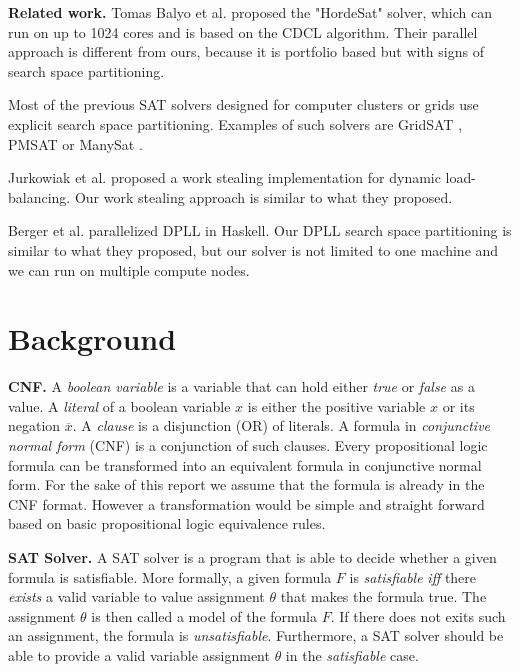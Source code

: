 \documentclass[letterpaper]{article}
\newcommand{\mypar}[1]{{\bf #1.}}
\begin{document}
\mypar{Related work}
Tomas Balyo et al. proposed the "HordeSat" solver, which can run on up to 1024 cores and is based on the CDCL algorithm.
Their parallel approach is different from ours, because it is portfolio based but with signs of search space partitioning. \cite{hordesat}

Most of the previous SAT solvers designed for computer clusters or grids use explicit search space partitioning.
Examples of such solvers are GridSAT \cite{gridsat}, PMSAT \cite{pmsat} or ManySat \cite{manysat}.

Jurkowiak et al. proposed a work stealing implementation for dynamic load-balancing. \cite{stealing}
Our work stealing approach is similar to what they proposed.

Berger et al. parallelized DPLL in Haskell. \cite{dpll_haskell}
Our DPLL search space partitioning is similar to what they proposed, but our solver is not limited to one machine and we can run on multiple compute nodes.

\section{Background}\label{sec:background}

\mypar{CNF}
A \textit{boolean variable} is a variable that can hold either \textit{true} or \textit{false} as a value.
A \textit{literal} of a boolean variable $x$ is either the positive variable $x$ or its negation $\overline{x}$.
A \textit{clause} is a disjunction (OR) of literals.
A formula in \textit{conjunctive normal form} (CNF) is a conjunction of such clauses.
Every propositional logic formula can be transformed into an equivalent formula in conjunctive normal form.
For the sake of this report we assume that the formula is already in the CNF format.
However a transformation would be simple and straight forward based on basic propositional logic equivalence rules.

\mypar{SAT Solver}
A SAT solver is a program that is able to decide whether a given formula is satisfiable.
More formally, a given formula $F$ is \textit{satisfiable} \textit{iff} there \textit{exists} a valid variable to value assignment $\theta$ that makes the formula true.
The assignment $\theta$ is then called a model of the formula $F$.
If there does not exits such an assignment, the formula is \textit{unsatisfiable}.
Furthermore, a SAT solver should be able to provide a valid variable assignment $\theta$ in the \textit{satisfiable} case.
\end{document}
